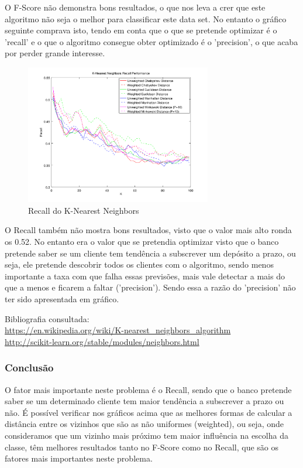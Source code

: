 \documentclass[portugues,final]{revdetua}
\begin{document}
O F-Score não demonstra bons resultados, o que nos leva a crer que este algoritmo não seja o melhor para classificar este data set. No entanto o gráfico seguinte comprava isto, tendo em conta que o que se pretende optimizar é o 'recall' e o que o algoritmo consegue obter optimizado é o 'precision', o que acaba por perder grande interesse.

\begin{figure}[H]
\centerline{\includegraphics[width=230pt]{images/knn_graph_recall.png}}
\caption{Recall do K-Nearest Neighbors}
\label{img:complete}
\end{figure}

O Recall também não mostra bons resultados, visto que o valor mais alto ronda os 0.52. No entanto era o valor que se pretendia optimizar visto que o banco pretende saber se um cliente tem tendência a subscrever um depósito a prazo, ou seja, ele pretende descobrir todos os clientes com o algoritmo, sendo menos importante a taxa com que falha essas previsões, mais vale detectar a mais do que a menos e ficarem a faltar ('precision'). Sendo essa a razão do 'precision' não ter sido apresentada em gráfico.

Bibliografia consultada:\\
\url{https://en.wikipedia.org/wiki/K-nearest_neighbors_algorithm}\\
\url{http://scikit-learn.org/stable/modules/neighbors.html}

\subsubsection{Conclusão}

O fator mais importante neste problema é o Recall, sendo que o banco pretende saber se um determinado cliente tem maior tendência a subscrever a prazo ou não. É possível verificar nos gráficos acima que as melhores formas de calcular a distância entre os vizinhos que são as não uniformes (weighted), ou seja, onde consideramos que um vizinho mais próximo tem maior influência na escolha da classe, têm melhores resultados tanto no F-Score como no Recall, que são os fatores mais importantes neste problema.\\
\end{document}

